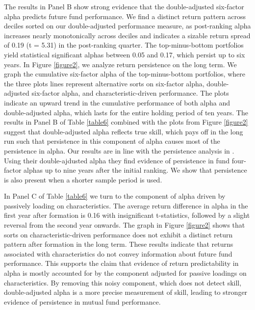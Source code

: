 The results in Panel B show strong evidence that the double-adjusted six-factor alpha predicts future fund performance. We find a distinct return pattern across deciles sorted on our double-adjusted performance measure, as post-ranking alpha increases nearly monotonically across deciles and indicates a sizable return spread of 0.19 (t = 5.31) in the post-ranking quarter. The top-minus-bottom portfolios yield statistical significant alphas between 0.05 and 0.17, which persist up to six years. In Figure \ref{figure2}, we analyze return persistence on the long term. We graph the cumulative six-factor alpha of the top-minus-bottom portfolios, where the three plots lines represent alternative sorts on six-factor alpha, double-adjusted six-factor alpha, and characteristic-driven performance. The plots indicate an upward trend in the cumulative performance of both alpha and double-adjusted alpha, which lasts for the entire holding period of ten years. The results in Panel B of Table \ref{table6} combined with the plots from Figure \ref{figure2} suggest that double-adjusted alpha reflects true skill, which pays off in the long run such that persistence in this component of alpha causes most of the persistence in alpha. Our results are in line with the persistence analysis in \citet{busse2017double}. Using their double-ajdusted alpha they find evidence of persistence in fund four-factor alphas up to nine years after the initial ranking. We show that persistence is also present when a shorter sample period is used. 

In Panel C of Table \ref{table6} we turn to the component of alpha driven by passively loading on characteristics. The average return difference in alpha in the first year after formation is 0.16 with insignificant t-statistics, followed by a slight reversal from the second year onwards. The graph in Figure \ref{figure2} shows that sorts on characteristic-driven performance does not exhibit a distinct return pattern after formation in the long term. These results indicate that returns associated with characteristics do not convey information about future fund performance. This supports the claim that evidence of return predictability in alpha is mostly accounted for by the component adjusted for passive loadings on characteristics. By removing this noisy component, which does not detect skill, double-adjusted alpha is a more precise measurement of skill, leading to stronger evidence of persistence in mutual fund performance. 


